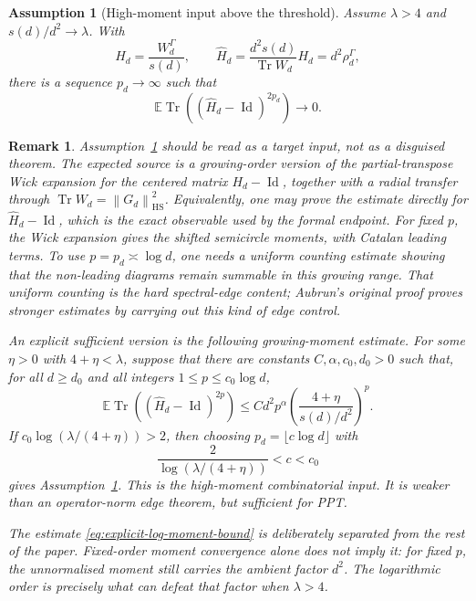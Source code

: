 \documentclass[11pt,reqno]{amsart}
\newtheorem{assumption}[theorem]{Assumption}
\newtheorem{remark}[theorem]{Remark}
\newcommand{\EE}{\mathbb E}
\newcommand{\Tr}{\operatorname{Tr}}
\newcommand{\Id}{\operatorname{Id}}
\newcommand{\HS}{\mathrm{HS}}
\newcommand{\norm}[1]{\left\lVert #1\right\rVert}
\begin{document}
\begin{assumption}[High-moment input above the threshold]
\label{ass:centered-trace-moment}
Assume \(\lambda>4\) and \(s(d)/d^2\to\lambda\).  With
\[
  H_d=\frac{W_d^\Gamma}{s(d)},
  \qquad
  \widehat H_d
  =
  \frac{d^2s(d)}{\Tr W_d}H_d
  =
  d^2\rho_d^\Gamma,
\]
there is a sequence \(p_d\to\infty\) such that
\[
  \EE\Tr\left((\widehat H_d-\Id)^{2p_d}\right)\longrightarrow0.
\]
\end{assumption}

\begin{remark}
Assumption~\ref{ass:centered-trace-moment} should be read as a target input,
not as a disguised theorem.  The expected source is a growing-order version of
the partial-transpose Wick expansion for the centered matrix \(H_d-\Id\),
together with a radial transfer through
\(\Tr W_d=\norm{G_d}_{\HS}^2\).  Equivalently, one may prove the estimate
directly for \(\widehat H_d-\Id\), which is the exact observable used by the
formal endpoint.  For fixed \(p\), the Wick expansion gives the shifted
semicircle moments, with Catalan leading terms.  To use
\(p=p_d\asymp\log d\), one needs a uniform counting estimate showing that the
non-leading diagrams remain summable in this growing range.  That uniform
counting is the hard spectral-edge content; Aubrun's original proof proves
stronger estimates by carrying out this kind of edge control.

An explicit sufficient version is the following growing-moment estimate.
For some \(\eta>0\) with \(4+\eta<\lambda\), suppose that there are
constants \(C,\alpha,c_0,d_0>0\) such that, for all \(d\ge d_0\) and all
integers \(1\le p\le c_0\log d\),
\begin{equation}
\label{eq:explicit-log-moment-bound}
  \EE\Tr\left((\widehat H_d-\Id)^{2p}\right)
  \le
  C d^2 p^\alpha
  \left(\frac{4+\eta}{s(d)/d^2}\right)^p.
\end{equation}
If \(c_0\log(\lambda/(4+\eta))>2\), then choosing
\(p_d=\lfloor c\log d\rfloor\) with
\[
  \frac{2}{\log(\lambda/(4+\eta))}<c<c_0
\]
gives Assumption~\ref{ass:centered-trace-moment}.  This is the
high-moment combinatorial input.  It is weaker than an operator-norm edge
theorem, but sufficient for PPT.

The estimate \eqref{eq:explicit-log-moment-bound} is deliberately separated
from the rest of the paper.  Fixed-order moment convergence alone does not
imply it: for fixed \(p\), the unnormalised moment still carries the ambient
factor \(d^2\).  The logarithmic order is precisely what can defeat that
factor when \(\lambda>4\).


\end{remark}
\end{document}

